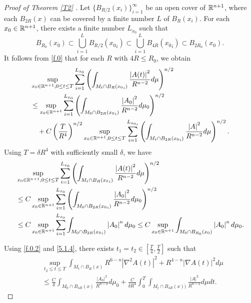 \documentclass{amsart}
\theoremstyle{definition}
\def\R{{\Bbb R}}
\numberwithin{equation}{section}
\begin{document}
\begin{proof}[Proof of Theorem   \ref{T2} ]
   Let $\{B_{R/2}(x_i)\}_{i=1}^{\infty}$ be an open cover of $\R^{n+1}$, where   each $B_{2R}(x)$ can be covered by a finite number $L$
   of $B_R(x_i)$.  For each $x_0\in\R^{n+1}$, there exists a finite number $L_{x_0}$ such that
   $$B_{R_0}(x_0)\subset\bigcup_{i=1}^L B_{R/2}({x_0}_i)\subset\bigcup_{i=1}^L B_{4R}({x_0}_i)\subset B_{2R_0}(x_0).$$
  It follows from  \eqref{f.0} that for  each $R$ with $4R\leq R_0$, we obtain
  \begin{align} \label{Cover1}
  &\sup_{x_0\in\R^{n+1}, 0\leq t\leq T}\sum_{i=1}^{L_{x_0}}\left (\int_{M_t\cap  B_R({x_0}_i)}\frac  {\left| A(t)\right|^{2}} {R^{n-2}} d\mu\right )^{n/2}  \\
 & \leq \sup_{x_0\in\R^{n+1}}\sum_{i=1}^{L_{x_0}}\left (\int_{M_0\cap  B_{2R}({x_0}_i)}\frac {\left| A_{0} \right|^{2}}{R^{n-2}}d\mu_{0}\right )^{n/2}  \nonumber\\
 &\quad +C \left (\frac {T} {R^4}\right )^{n/2} \sup_{x_0\in\R^{n+1}, 0\leq t\leq T}\sum_{i=1}^{L_{{x_0}_i}} \left ( \int_{M_t\cap B_{2R}({x_0}_i)} \frac {\left| A\right|^{2}}{R^{n-2}}
 d\mu \right )^{n/2}  \mbox{.}\nonumber
   \end{align}
Using $T=\delta R^4$ with  sufficiently small $\delta$, we have
\begin{align} \label{Cover2}
 &\sup_{x_0\in\R^{n+1}, 0\leq t\leq T}\sum_{i=1}^{L_{x_0}}\left (\int_{M_t\cap B_R({x_0}_i)}\frac  {\left| A(t)\right|^{2}} {R^{n-2}} d\mu\right )^{n/2}\\
  &\leq C\sup_{x_0\in\R^{n+1}}\sum_{i=1}^{L_{x_0}}\left (\int_{M_0\cap B_{2R}({x_0}_i)}\frac {\left| A_{0} \right|^{2}}{R^{n-2}}d\mu_{0}\right )^{n/2}\nonumber\\
& \leq C\sup_{x_0\in\R^{n+1}}\sum_{i=1}^{L_{x_0}}\int_{M_0\cap B_{2R}({x_0}_i)} \left| A_{0} \right|^{n} d\mu_{0} \nonumber
\leq C\sup_{x_0\in\R^{n+1}} \int_{M_0\cap  B_{R_0}({x_0})} \left| A_{0} \right|^{n} d\mu_{0} .
   \end{align}

Using \eqref{f.0.2} and \eqref{5.1.4}, there exists $t_1=t_2\in [ \frac T4 , \frac T2]$ such that
\begin{align} \label{Cover3}
   &  \sup_{t_2\leq t\leq T}\int_{M_t\cap B_{R}(x) } R^{6-n} \left| \nabla^{2} A(t)  \right|^{2}+  R^{4-n}|\nabla A(t)|^2  d\mu\\
 & \leq \frac C{\delta}\int_{M_0\cap B_{4R}(x)} \frac {\left| A_0 \right|^{2}}{R^{n-2}} d\mu_0  + \frac C {\delta R^4} \int_0^T \int_{M_t\cap B_{4R}(x))}
  \frac {\left| A\right|^{2}}{R^{n-2}}
 d\mu d t \nonumber
  \mbox{.}
\end{align}


\end{proof}
\end{document}
